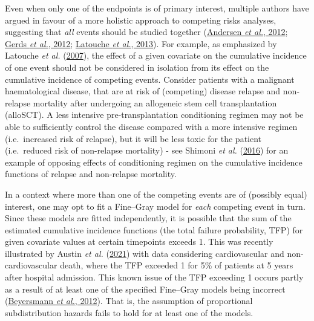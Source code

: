 \documentclass[
  letterpaper,
  DIV=11,
  numbers=noendperiod]{scrreprt}
\begin{document}
Even when only one of the endpoints is of primary interest, multiple
authors have argued in favour of a more holistic approach to competing
risks analyses, suggesting that \emph{all} events should be studied
together
(\protect\hyperlink{ref-andersenCompetingRisksEpidemiology2012}{Andersen
\emph{et al.}, 2012};
\protect\hyperlink{ref-gerdsAbsoluteRiskRegression2012a}{Gerds \emph{et
al.}, 2012};
\protect\hyperlink{ref-latoucheCompetingRisksAnalysis2013}{Latouche
\emph{et al.}, 2013}). For example, as emphasized by Latouche \emph{et
al.}
(\protect\hyperlink{ref-latoucheMisspecifiedRegressionModel2007}{2007}),
the effect of a given covariate on the cumulative incidence of one event
should not be considered in isolation from its effect on the cumulative
incidence of competing events. Consider patients with a malignant
haematological disease, that are at risk of (competing) disease relapse
and non-relapse mortality after undergoing an allogeneic stem cell
transplantation (alloSCT). A less intensive pre-transplantation
conditioning regimen may not be able to sufficiently control the disease
compared with a more intensive regimen (i.e.~increased risk of relapse),
but it will be less toxic for the patient (i.e.~reduced risk of
non-relapse mortality) - see Shimoni \emph{et al.}
(\protect\hyperlink{ref-shimoniLongtermSurvivalLate2016}{2016}) for an
example of opposing effects of conditioning regimen on the cumulative
incidence functions of relapse and non-relapse mortality.

In a context where more than one of the competing events are of
(possibly equal) interest, one may opt to fit a Fine--Gray model for
\emph{each} competing event in turn. Since these models are fitted
independently, it is possible that the sum of the estimated cumulative
incidence functions (the total failure probability, TFP) for given
covariate values at certain timepoints exceeds 1. This was recently
illustrated by Austin \emph{et al.}
(\protect\hyperlink{ref-austinFineGraySubdistributionHazard2021}{2021})
with data considering cardiovascular and non-cardiovascular death, where
the TFP exceeded 1 for 5\% of patients at 5 years after hospital
admission. This known issue of the TFP exceeding 1 occurs partly as a
result of at least one of the specified Fine--Gray models being
incorrect
(\protect\hyperlink{ref-beyersmannCompetingRisksMultistate2012}{Beyersmann
\emph{et al.}, 2012}). That is, the assumption of proportional
subdistribution hazards fails to hold for at least one of the models.
\end{document}
